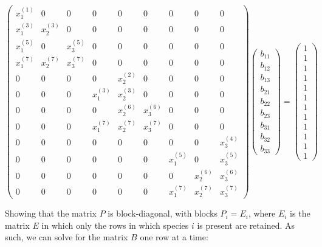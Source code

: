 \documentclass[
]{book}
\begin{document}
\[
\begin{pmatrix}
x_1^{(1)} & 0 & 0      & 0 & 0 & 0     & 0 & 0 & 0 \\
x_1^{(3)} & x_2^{(3)} & 0      & 0 & 0 & 0     & 0 & 0 & 0 \\
x_1^{(5)} & 0 & x_3^{(5)}       & 0 & 0 & 0     & 0 & 0 & 0 \\
x_1^{(7)} & x_2^{(7)} & x_3^{(7)} & 0 & 0 & 0     & 0 & 0 & 0 \\
0 & 0 & 0     & 0 & x_2^{(2)} & 0     & 0 & 0 & 0 \\
0 & 0 & 0     & x_1^{(3)} & x_2^{(3)} & 0     & 0 & 0 & 0 \\
0 & 0 & 0     & 0 & x_2^{(6)} & x_3^{(6)}     & 0 & 0 & 0 \\
0 & 0 & 0     & x_1^{(7)} & x_2^{(7)} & x_3^{(7)} & 0 & 0 & 0 \\
0 & 0 & 0      & 0 & 0 & 0     & 0 & 0 & x_3^{(4)} \\
0 & 0 & 0     & 0 & 0 & 0     & x_1^{(5)} & 0 & x_3^{(5)} \\
0 & 0 & 0     & 0 & 0 & 0        & 0 & x_2^{(6)} & x_3^{(6)}\\
0 & 0 & 0     & 0 & 0 & 0        & x_1^{(7)} & x_2^{(7)} & x_3^{(7)} 
\end{pmatrix} 
\begin{pmatrix}
b_{11}\\
b_{12}\\
b_{13}\\
b_{21}\\
b_{22}\\
b_{23}\\
b_{31}\\
b_{32}\\
b_{33}
\end{pmatrix} 
= 
\begin{pmatrix}
1\\
1\\
1\\
1\\
1\\
1\\
1\\
1\\
1\\
1\\
1\\
1
\end{pmatrix}
\]

Showing that the matrix \(P\) is block-diagonal, with blocks \(P_i = E_i\), where \(E_i\) is the matrix \(E\) in which only the rows in which species \(i\) is present are retained. As such, we can solve for the matrix \(B\) one row at a time:
\end{document}
